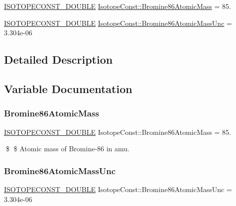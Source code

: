 \begin{DoxyCompactItemize}
\item 
\mbox{\hyperlink{group___isotope_const-_macros_ga8f45a7272ce02c0b4c65c44636ed719a}{I\+S\+O\+T\+O\+P\+E\+C\+O\+N\+S\+T\+\_\+\+D\+O\+U\+B\+LE}} \mbox{\hyperlink{group___isotope_const-_bromine-_br86_ga16c66727dc9e4c1fac3c218647e6add5}{Isotope\+Const\+::\+Bromine86\+Atomic\+Mass}} = 85.
\item 
\mbox{\hyperlink{group___isotope_const-_macros_ga8f45a7272ce02c0b4c65c44636ed719a}{I\+S\+O\+T\+O\+P\+E\+C\+O\+N\+S\+T\+\_\+\+D\+O\+U\+B\+LE}} \mbox{\hyperlink{group___isotope_const-_bromine-_br86_ga94dacd8c7688e03a65d21c0532bb2fde}{Isotope\+Const\+::\+Bromine86\+Atomic\+Mass\+Unc}} = 3.\+304e-\/06
\end{DoxyCompactItemize}


\subsection{Detailed Description}


\subsection{Variable Documentation}
\mbox{\label{group___isotope_const-_bromine-_br86_ga16c66727dc9e4c1fac3c218647e6add5}} 
\subsubsection{\texorpdfstring{Bromine86\+Atomic\+Mass}{Bromine86AtomicMass}}
{\footnotesize\ttfamily \mbox{\hyperlink{group___isotope_const-_macros_ga8f45a7272ce02c0b4c65c44636ed719a}{I\+S\+O\+T\+O\+P\+E\+C\+O\+N\+S\+T\+\_\+\+D\+O\+U\+B\+LE}} Isotope\+Const\+::\+Bromine86\+Atomic\+Mass = 85.}

\$ \$ Atomic mass of Bromine-\/86 in amu. \mbox{\label{group___isotope_const-_bromine-_br86_ga94dacd8c7688e03a65d21c0532bb2fde}} 
\subsubsection{\texorpdfstring{Bromine86\+Atomic\+Mass\+Unc}{Bromine86AtomicMassUnc}}
{\footnotesize\ttfamily \mbox{\hyperlink{group___isotope_const-_macros_ga8f45a7272ce02c0b4c65c44636ed719a}{I\+S\+O\+T\+O\+P\+E\+C\+O\+N\+S\+T\+\_\+\+D\+O\+U\+B\+LE}} Isotope\+Const\+::\+Bromine86\+Atomic\+Mass\+Unc = 3.\+304e-\/06}

